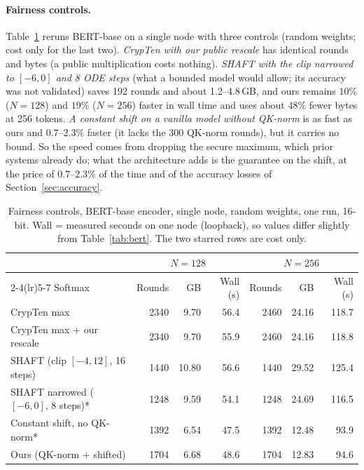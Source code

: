 \documentclass[11pt]{article}
\begin{document}
\paragraph{Fairness controls.} Table~\ref{tab:fair} reruns BERT-base on a single node with three controls (random weights; cost
only for the last two). \emph{CrypTen with our public rescale} has identical rounds and bytes (a public multiplication costs nothing).
\emph{SHAFT with the clip narrowed to $[-6,0]$ and 8 ODE steps} (what a bounded model would allow; its accuracy was not
validated) saves 192 rounds and about 1.2--4.8\,GB, and ours remains $10\%$ ($N{=}128$) and $19\%$ ($N{=}256$) faster in wall
time and uses about $48\%$ fewer bytes at 256 tokens. \emph{A constant shift on a vanilla model without QK-norm} is as fast as ours
and $0.7$--$2.3\%$ faster (it lacks the 300 QK-norm rounds), but it carries no bound. So the speed comes from dropping the
secure maximum, which prior systems already do; what the architecture adds is the guarantee on the shift, at the price of
$0.7$--$2.3\%$ of the time and of the accuracy losses of Section~\ref{sec:accuracy}.

\begin{table}[tbp]\centering\footnotesize\setlength{\tabcolsep}{4pt}
\caption{Fairness controls, BERT-base encoder, single node, random weights, one run, 16-bit. Wall = measured seconds on one node
(loopback), so values differ slightly from Table~\ref{tab:bert}. The two starred rows are cost only.}\label{tab:fair}
\begin{tabular}{@{}lrrrrrr@{}}\toprule
 & \multicolumn{3}{c}{$N=128$} & \multicolumn{3}{c}{$N=256$}\\\cmidrule(lr){2-4}\cmidrule(lr){5-7}
Softmax & Rounds & GB & Wall (s) & Rounds & GB & Wall (s)\\\midrule
CrypTen max & 2340 & 9.70 & 56.4 & 2460 & 24.16 & 118.7\\
CrypTen max + our rescale & 2340 & 9.70 & 55.9 & 2460 & 24.16 & 118.8\\
SHAFT (clip $[-4,12]$, 16 steps) & 1440 & 10.80 & 56.6 & 1440 & 29.52 & 125.4\\
SHAFT narrowed ($[-6,0]$, 8 steps)* & 1248 & 9.59 & 54.1 & 1248 & 24.69 & 116.5\\
Constant shift, no QK-norm* & 1392 & 6.54 & 47.5 & 1392 & 12.48 & 93.9\\
Ours (QK-norm + shifted) & 1704 & 6.68 & 48.6 & 1704 & 12.83 & 94.6\\\bottomrule
\end{tabular}
\end{table}
\end{document}

